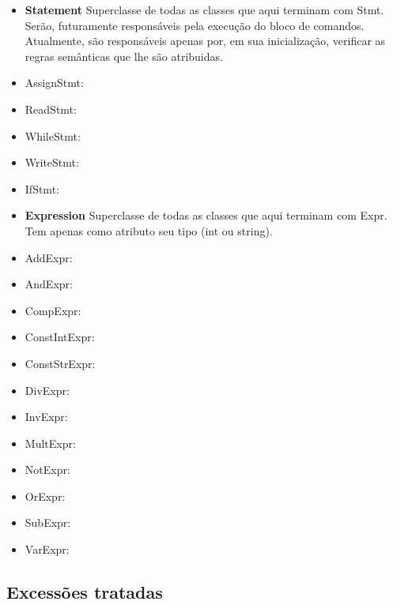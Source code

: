\documentclass[11pt]{article}
\begin{document}
\begin{itemize}
			\begin{itemize}
				\item \textbf{Statement} Superclasse de todas as classes que aqui terminam com Stmt. Serão, futuramente responsáveis pela execução do bloco de comandos. Atualmente, são responsáveis apenas por, em sua inicialização, verificar as regras semânticas que lhe são atribuidas.
				\item AssignStmt: 
				\item ReadStmt:
				\item WhileStmt:
				\item WriteStmt: 
				\item IfStmt:
				\item \textbf{Expression} Superclasse de todas as classes que aqui terminam com Expr. Tem apenas como atributo seu tipo (int ou string).
				\item AddExpr: 
				\item AndExpr: 
				\item CompExpr: 
				\item ConstIntExpr: 
				\item ConstStrExpr: 
				\item DivExpr: 
				\item InvExpr: 
				\item MultExpr: 
				\item NotExpr: 
				\item OrExpr: 
				\item SubExpr: 
				\item VarExpr: 
			\end{itemize}
			
		
		\end{itemize}
		
	\subsection{Excessões tratadas}
	
\end{document}
